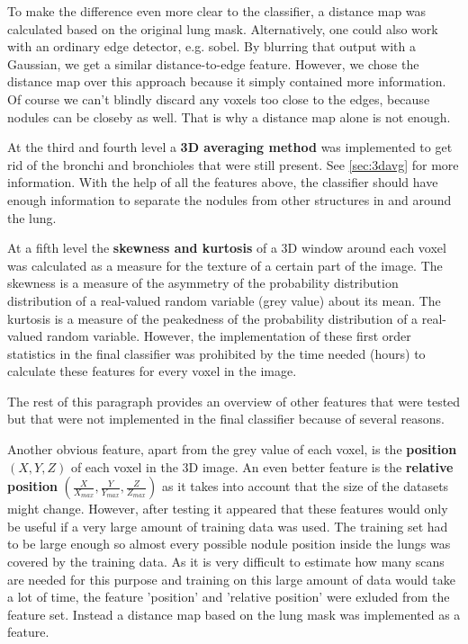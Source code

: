 To make the difference even more clear to the classifier, a distance map was
calculated based on the original lung mask. Alternatively, one could also work
with an ordinary edge detector, e.g. sobel. By blurring that output with a
Gaussian, we get a similar distance-to-edge feature. However, we chose the
distance map over this approach because it simply contained more information. Of
course we can't blindly discard any voxels too close to the edges, because
nodules can be closeby as well. That is why a distance map alone is not enough.


At the third and fourth level a \textbf{3D averaging method} \cite{keshani} was
implemented to get rid of the bronchi and bronchioles that were still present.
See \autoref{sec:3davg} for more information. With the help of all the features
above, the classifier should have enough information to separate the nodules
from other structures in and around the lung.

At a fifth level the \textbf{skewness and kurtosis} of a 3D window around each
voxel was calculated as a measure for the texture of a certain part of the image. The
skewness is a measure of the asymmetry of the probability distribution
distribution of a real-valued random variable (grey value) about its mean. The
kurtosis is a measure of the peakedness of the probability distribution of a
real-valued random variable. However, the implementation of these first order
statistics in the final classifier was prohibited by the time needed (hours) to
calculate these features for every voxel in the image.

The rest of this paragraph provides an overview of other features that were
tested but that were not implemented in the final classifier because of several
reasons.

Another obvious feature, apart from the grey value of each voxel, is the
\textbf{position} $(X, Y, Z)$ of each voxel in the 3D image. An even better
feature is the \textbf{relative position} $(\tfrac{X}{X_{max}}, \tfrac{Y}{Y_{max}}, \tfrac{Z}{Z_{max}})$ as
it takes into account that the size of the datasets might change. However, after
testing it appeared that these features would only be useful if a very large
amount of training data was used. The training set had to be large enough so
almost every possible nodule position inside the lungs was covered by the
training data. As it is very difficult to estimate how many scans are needed for
this purpose and training on this large amount of data would take a lot of time,
the feature 'position' and 'relative position' were exluded from the feature set.
Instead a distance map based on the lung mask was implemented as a feature.

